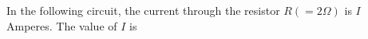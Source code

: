 
\item In the following circuit, the current through the resistor \( R (= 2\Omega) \) is \( I \) Amperes. The value of \( I \) is \underline{\hspace{2.5 cm}}

    \begin{center}
    \end{center}
